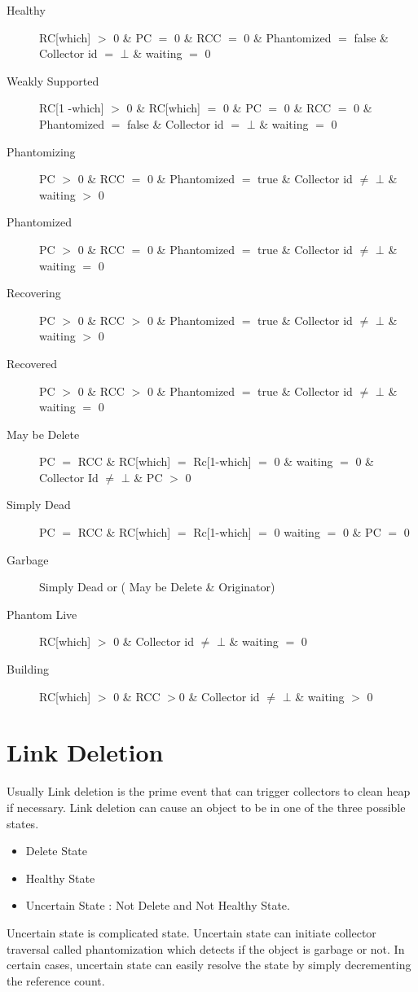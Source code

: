 \documentclass{article}
\begin{document}
\begin{description}
  \item[Healthy] RC[which] $>$ 0 \& PC $=$ 0 \& RCC $=$ 0 \& Phantomized $=$ false \& Collector id $=$ $\bot$ \& waiting $=$ 0
  \item[Weakly Supported] RC[1 -which] $>$ 0 \& RC[which] $=$ 0 \& PC $=$ 0 \& RCC $=$ 0 \& Phantomized $=$ false \& Collector id $=$ $\bot$ \& waiting $=$ 0
  \item[Phantomizing] PC $>$ 0 \& RCC $=$ 0 \& Phantomized $=$ true \& Collector id $\neq$ $\bot$ \& waiting $>$ 0
  \item[Phantomized] PC $>$ 0 \& RCC $=$ 0 \& Phantomized $=$ true \& Collector id $\neq$ $\bot$ \& waiting $=$ 0
   \item[Recovering] PC $>$ 0 \& RCC $>$ 0 \& Phantomized $=$ true \& Collector id $\neq$ $\bot$ \& waiting $>$ 0
   \item[Recovered] PC $>$ 0 \& RCC $>$ 0 \& Phantomized $=$ true \& Collector id $\neq$ $\bot$ \& waiting $=$ 0
  \item[May be Delete] PC $=$ RCC \& RC[which] $=$ Rc[1-which] $=$ 0 \& waiting $=$ 0 \& Collector Id $\neq$ $\bot$ \& PC $>$ 0
  	\item [Simply Dead] PC $=$ RCC \& RC[which] $=$ Rc[1-which] $=$ 0 waiting $=$ 0 \& PC $=$ 0 
  	\item [Garbage] Simply Dead or  ( May be Delete \& Originator)
  \item[Phantom Live] RC[which] $>$ 0 \& Collector id $\neq$ $\bot$ \& waiting $=$ 0
   \item[Building] RC[which] $>$ 0 \& RCC $>$0 \& Collector id $\neq$ $\bot$ \& waiting $>$ 0

\end{description}
\section{Link Deletion}
	Usually Link deletion is the prime event that can trigger collectors to clean heap if necessary. Link deletion can cause an object to be in one of the three possible states. 
\begin{itemize}
  \item Delete State
  \item Healthy State
  \item Uncertain State : Not Delete and Not Healthy State.
\end{itemize}
	Uncertain state is complicated state. Uncertain state can initiate collector traversal called phantomization which detects if the object is garbage or not. In certain cases, uncertain state can easily resolve the state by simply decrementing the reference count. 
\end{document}
